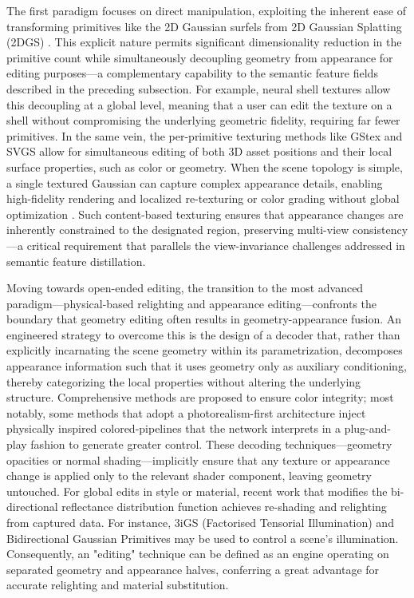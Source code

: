 \documentclass[11pt,a4paper]{article}
\begin{document}
The first paradigm focuses on direct manipulation, exploiting the inherent ease of transforming primitives like the 2D Gaussian surfels from 2D Gaussian Splatting (2DGS) \cite{arxiv:2403.17888v1}. This explicit nature permits significant dimensionality reduction in the primitive count while simultaneously decoupling geometry from appearance for editing purposes---a complementary capability to the semantic feature fields described in the preceding subsection. For example, neural shell textures allow this decoupling at a global level, meaning that a user can edit the texture on a shell without compromising the underlying geometric fidelity, requiring far fewer primitives. In the same vein, the per-primitive texturing methods like GStex \cite{arxiv:2409.12954v1} and SVGS \cite{arxiv:2411.18966v2} allow for simultaneous editing of both 3D asset positions and their local surface properties, such as color or geometry. When the scene topology is simple, a single textured Gaussian can capture complex appearance details, enabling high-fidelity rendering and localized re-texturing or color grading without global optimization \cite{arxiv:2407.09733v2}. Such content-based texturing ensures that appearance changes are inherently constrained to the designated region, preserving multi-view consistency---a critical requirement that parallels the view-invariance challenges addressed in semantic feature distillation.

Moving towards open-ended editing, the transition to the most advanced paradigm---physical-based relighting and appearance editing---confronts the boundary that geometry editing often results in geometry-appearance fusion. An engineered strategy to overcome this is the design of a decoder that, rather than explicitly incarnating the scene geometry within its parametrization, decomposes appearance information such that it uses geometry only as auxiliary conditioning, thereby categorizing the local properties without altering the underlying structure. Comprehensive methods are proposed to ensure color integrity; most notably, some methods that adopt a photorealism-first architecture \cite{arxiv:2411.18625v2} inject physically inspired colored-pipelines that the network interprets in a plug-and-play fashion to generate greater control. These decoding techniques---geometry opacities \cite{arxiv:2606.05124v1} or normal shading---implicitly ensure that any texture or appearance change is applied only to the relevant shader component, leaving geometry untouched. For global edits in style or material, recent work that modifies the bi-directional reflectance distribution function achieves re-shading and relighting from captured data. For instance, 3iGS (Factorised Tensorial Illumination) \cite{arxiv:2408.03753v1} and Bidirectional Gaussian Primitives \cite{arxiv:2408.13370v1} may be used to control a scene's illumination. Consequently, an "editing" technique can be defined as an engine operating on separated geometry and appearance halves, conferring a great advantage for accurate relighting and material substitution.
\end{document}
